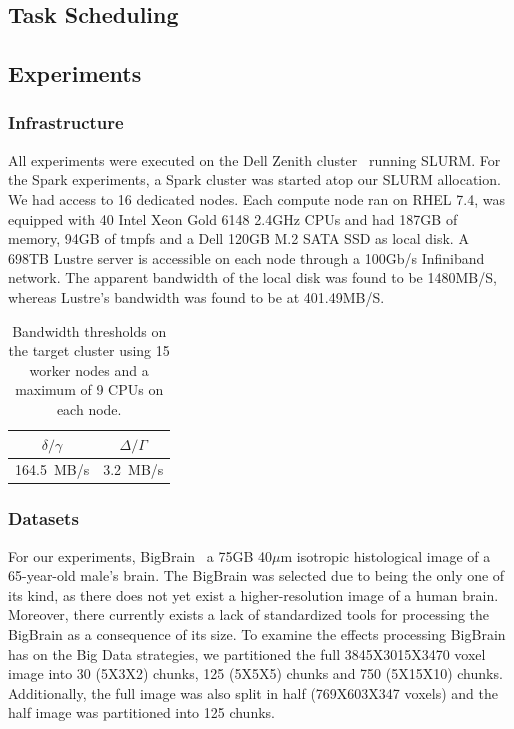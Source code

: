 \documentclass{IEEEtran}
\begin{document}


\subsection{Task Scheduling}


\subsection{Experiments} %

\subsubsection{Infrastructure} %

All experiments were executed on the Dell Zenith cluster~\cite{dellHPC} running 
SLURM. For the 
Spark experiments, a Spark cluster was started atop our SLURM allocation. We
had access to 16 dedicated nodes. Each compute node ran on RHEL 7.4, was 
equipped with 40 Intel Xeon Gold 6148 2.4GHz CPUs and had
187GB of memory, 94GB of tmpfs and a Dell 120GB M.2 SATA SSD as local disk. 
A 698TB Lustre server is accessible on each node through a 100Gb/s Infiniband
network. The apparent bandwidth of the local disk was found to be 1480MB/S, 
whereas Lustre's bandwidth was found to be at 401.49MB/S.

\begin{table}
\centering
\begin{tabular}{c|c}
$\delta/\gamma$ & $\Delta/\Gamma$\\
\hline
164.5~MB/s         & 3.2~MB/s
\end{tabular}
\label{table:infrastructure}
\caption{Bandwidth thresholds on the target cluster using 15 worker nodes and a
         maximum of 9 CPUs on each node.}
\end{table}


\subsubsection{Datasets} %

For our experiments, BigBrain~\cite{bigbrain} a 75GB 40$\mu$m isotropic 
histological image of a 65-year-old male's brain. The BigBrain was selected due 
to being the only one of its kind, as there does not yet exist a 
higher-resolution image of a human brain. Moreover, there currently exists a 
lack of standardized tools for processing the BigBrain as a consequence 
of its size. To examine the effects processing BigBrain has on the Big Data 
strategies, we partitioned the full 3845X3015X3470 voxel image into 30 (5X3X2)
chunks, 125 (5X5X5) chunks and 750 (5X15X10) chunks. Additionally, the full 
image was also split in half (769X603X347 voxels) and the half image was 
partitioned into 125 chunks.
\end{document}
